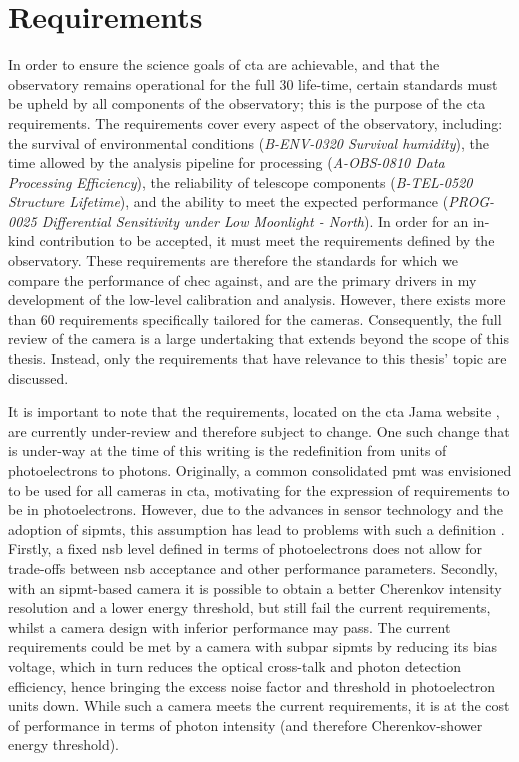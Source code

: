 \section{Requirements}

In order to ensure the science goals of \gls{cta} are achievable, and that the observatory remains operational for the full 30 life-time, certain standards must be upheld by all components of the observatory; this is the purpose of the \gls{cta} requirements. The requirements cover every aspect of the observatory, including: the survival of environmental conditions (\textit{B-ENV-0320 Survival humidity}), the time allowed by the analysis pipeline for processing (\textit{A-OBS-0810 Data Processing Efficiency}), the reliability of telescope components (\textit{B-TEL-0520 Structure Lifetime}), and the ability to meet the expected performance (\textit{PROG-0025 Differential Sensitivity under Low Moonlight - North}). In order for an in-kind contribution to be accepted, it must meet the requirements defined by the observatory. These requirements are therefore the standards for which we compare the performance of \gls{chec} against, and are the primary drivers in my development of the low-level calibration and analysis. However, there exists more than 60 requirements specifically tailored for the cameras. Consequently, the full review of the camera is a large undertaking that extends beyond the scope of this thesis. Instead, only the requirements that have relevance to this thesis' topic are discussed.

It is important to note that the requirements, located on the \gls{cta} Jama website \cite{cta-jama}, are currently under-review and therefore subject to change. One such change that is under-way at the time of this writing is the redefinition from units of photoelectrons to photons. Originally, a common consolidated \gls{pmt} was envisioned to be used for all cameras in \gls{cta}, motivating for the expression of requirements to be in photoelectrons. However, due to the advances in sensor technology and the adoption of \glspl{sipmt}, this assumption has lead to problems with such a definition \cite{petophotons}. Firstly, a fixed \gls{nsb} level defined in terms of photoelectrons does not allow for trade-offs between \gls{nsb} acceptance and other performance parameters. Secondly, with an \gls{sipmt}-based camera it is possible to obtain a better Cherenkov intensity resolution and a lower energy threshold, but still fail the current requirements, whilst a camera design with inferior performance may pass. The current requirements could be met by a camera with subpar \glspl{sipmt} by reducing its bias voltage, which in turn reduces the optical cross-talk and photon detection efficiency, hence bringing the excess noise factor and threshold in photoelectron units down. While such a camera meets the current requirements, it is at the cost of performance in terms of photon intensity (and therefore Cherenkov-shower energy threshold). 

